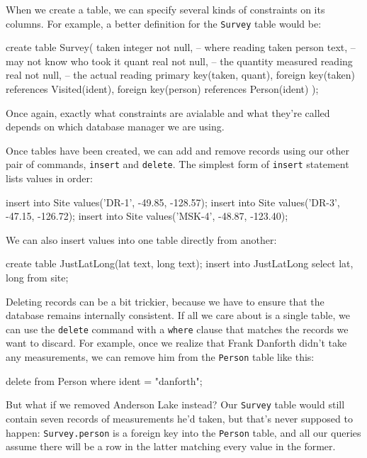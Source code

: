\documentclass{book}
\begin{document}
When we create a table, we can specify several kinds of constraints on
its columns. For example, a better definition for the \texttt{Survey}
table would be:

\begin{VerbIn}
create table Survey(
    taken   integer not null, -- where reading taken
    person  text,             -- may not know who took it
    quant   real not null,    -- the quantity measured
    reading real not null,    -- the actual reading
    primary key(taken, quant),
    foreign key(taken) references Visited(ident),
    foreign key(person) references Person(ident)
);
\end{VerbIn}

Once again, exactly what constraints are avialable and what they're
called depends on which database manager we are using.

Once tables have been created, we can add and remove records using our
other pair of commands, \texttt{insert} and \texttt{delete}. The
simplest form of \texttt{insert} statement lists values in order:

\begin{VerbIn}
insert into Site values('DR-1', -49.85, -128.57);
insert into Site values('DR-3', -47.15, -126.72);
insert into Site values('MSK-4', -48.87, -123.40);
\end{VerbIn}

We can also insert values into one table directly from another:

\begin{VerbIn}
create table JustLatLong(lat text, long text);
insert into JustLatLong select lat, long from site;
\end{VerbIn}

Deleting records can be a bit trickier, because we have to ensure that
the database remains internally consistent. If all we care about is a
single table, we can use the \texttt{delete} command with a
\texttt{where} clause that matches the records we want to discard. For
example, once we realize that Frank Danforth didn't take any
measurements, we can remove him from the \texttt{Person} table like
this:

\begin{VerbIn}
delete from Person where ident = "danforth";
\end{VerbIn}

But what if we removed Anderson Lake instead? Our \texttt{Survey} table
would still contain seven records of measurements he'd taken, but that's
never supposed to happen: \texttt{Survey.person} is a foreign key into
the \texttt{Person} table, and all our queries assume there will be a
row in the latter matching every value in the former.
\end{document}
